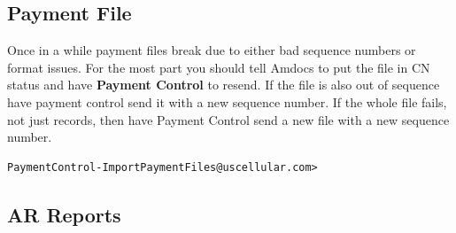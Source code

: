 \documentclass[12pt,twoside]{article}
\begin{document}
\subsection{Payment File}
\label{sec:orgheadline64}
Once in a while payment files break due to either bad sequence
numbers or format issues. For the most part you should tell
Amdocs to put the file in CN status and have \textbf{Payment Control}
to resend. If the file is also out of sequence have payment
control send it with a new sequence number. If the whole file
fails, not just records, then have Payment Control send a new
file with a new sequence number.

\begin{verbatim}
PaymentControl-ImportPaymentFiles@uscellular.com>
\end{verbatim}
\subsection{AR Reports}
\label{sec:orgheadline65}
\end{document}
